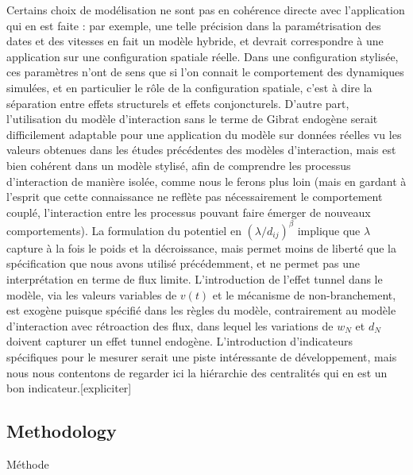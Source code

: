 Certains choix de modélisation ne sont pas en cohérence directe avec l'application qui en est faite : par exemple, une telle précision dans la paramétrisation des dates et des vitesses en fait un modèle hybride, et devrait correspondre à une application sur une configuration spatiale réelle. Dans une configuration stylisée, ces paramètres n'ont de sens que si l'on connait le comportement des dynamiques simulées, et en particulier le rôle de la configuration spatiale, c'est à dire la séparation entre effets structurels et effets conjoncturels. D'autre part, l'utilisation du modèle d'interaction sans le terme de Gibrat endogène serait difficilement adaptable pour une application du modèle sur données réelles vu les valeurs obtenues dans les études précédentes des modèles d'interaction, mais est bien cohérent dans un modèle stylisé, afin de comprendre les processus d'interaction de manière isolée, comme nous le ferons plus loin (mais en gardant à l'esprit que cette connaissance ne reflète pas nécessairement le comportement couplé, l'interaction entre les processus pouvant faire émerger de nouveaux comportements). La formulation du potentiel en $(\lambda / d_{ij})^\beta$  implique que $\lambda$ capture à la fois le poids et la décroissance, mais permet moins de liberté que la spécification que nous avons utilisé précédemment, et ne permet pas une interprétation en terme de flux limite. L'introduction de l'effet tunnel dans le modèle, via les valeurs variables de $v(t)$ et le mécanisme de non-branchement, est exogène puisque spécifié dans les règles du modèle, contrairement au modèle d'interaction avec rétroaction des flux, dans lequel les variations de $w_N$ et $d_N$ doivent capturer un effet tunnel endogène. L'introduction d'indicateurs spécifiques pour le mesurer serait une piste intéressante de développement, mais nous nous contentons de regarder ici la hiérarchie des centralités qui en est un bon indicateur.[expliciter]



\subsection{Methodology}{Méthode}

